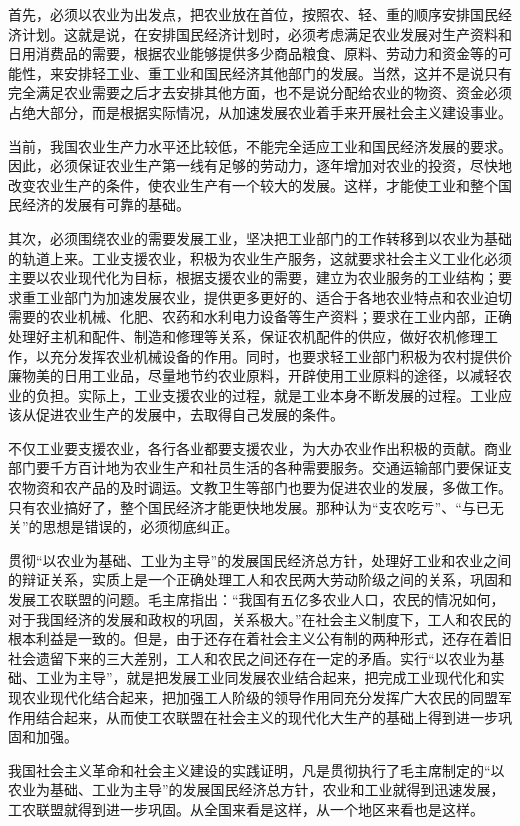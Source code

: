 \documentclass{book}
\begin{document}
首先，必须以农业为出发点，把农业放在首位，按照农、轻、重的顺序安排国民经济计划。这就是说，在安排国民经济计划时，必须考虑满足农业发展对生产资料和日用消费品的需要，根据农业能够提供多少商品粮食、原料、劳动力和资金等的可能性，来安排轻工业、重工业和国民经济其他部门的发展。当然，这并不是说只有完全满足农业需要之后才去安排其他方面，也不是说分配给农业的物资、资金必须占绝大部分，而是根据实际情况，从加速发展农业着手来开展社会主义建设事业。

当前，我国农业生产力水平还比较低，不能完全适应工业和国民经济发展的要求。因此，必须保证农业生产第一线有足够的劳动力，逐年增加对农业的投资，尽快地改变农业生产的条件，使农业生产有一个较大的发展。这样，才能使工业和整个国民经济的发展有可靠的基础。

其次，必须围绕农业的需要发展工业，坚决把工业部门的工作转移到以农业为基础的轨道上来。工业支援农业，积极为农业生产服务，这就要求社会主义工业化必须主要以农业现代化为目标，根据支援农业的需要，建立为农业服务的工业结构；要求重工业部门为加速发展农业，提供更多更好的、适合于各地农业特点和农业迫切需要的农业机械、化肥、农药和水利电力设备等生产资料；要求在工业内部，正确处理好主机和配件、制造和修理等关系，保证农机配件的供应，做好农机修理工作，以充分发挥农业机械设备的作用。同时，也要求轻工业部门积极为农村提供价廉物美的日用工业品，尽量地节约农业原料，开辟使用工业原料的途径，以减轻农业的负担。实际上，工业支援农业的过程，就是工业本身不断发展的过程。工业应该从促进农业生产的发展中，去取得自己发展的条件。

不仅工业要支援农业，各行各业都要支援农业，为大办农业作出积极的贡献。商业部门要千方百计地为农业生产和社员生活的各种需要服务。交通运输部门要保证支农物资和农产品的及时调运。文教卫生等部门也要为促进农业的发展，多做工作。只有农业搞好了，整个国民经济才能更快地发展。那种认为“支农吃亏”、“与已无关”的思想是错误的，必须彻底纠正。

贯彻“以农业为基础、工业为主导”的发展国民经济总方针，处理好工业和农业之间的辩证关系，实质上是一个正确处理工人和农民两大劳动阶级之间的关系，巩固和发展工农联盟的问题。毛主席指出：“我国有五亿多农业人口，农民的情况如何，对于我国经济的发展和政权的巩固，关系极大。”在社会主义制度下，工人和农民的根本利益是一致的。但是，由于还存在着社会主义公有制的两种形式，还存在着旧社会遗留下来的三大差别，工人和农民之间还存在一定的矛盾。实行“以农业为基础、工业为主导”，就是把发展工业同发展农业结合起来，把完成工业现代化和实现农业现代化结合起来，把加强工人阶级的领导作用同充分发挥广大农民的同盟军作用结合起来，从而使工农联盟在社会主义的现代化大生产的基础上得到进一步巩固和加强。

我国社会主义革命和社会主义建设的实践证明，凡是贯彻执行了毛主席制定的“以农业为基础、工业为主导”的发展国民经济总方针，农业和工业就得到迅速发展，工农联盟就得到进一步巩固。从全国来看是这样，从一个地区来看也是这样。
\end{document}
